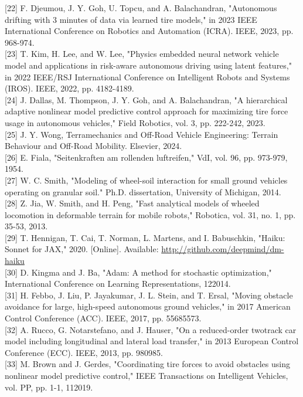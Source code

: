 \documentclass[10pt]{article}
\begin{document}
[22] F. Djeumou, J. Y. Goh, U. Topcu, and A. Balachandran, "Autonomous drifting with 3 minutes of data via learned tire models," in 2023 IEEE International Conference on Robotics and Automation (ICRA). IEEE, 2023, pp. 968-974.\\[0pt]
[23] T. Kim, H. Lee, and W. Lee, "Physics embedded neural network vehicle model and applications in risk-aware autonomous driving using latent features," in 2022 IEEE/RSJ International Conference on Intelligent Robots and Systems (IROS). IEEE, 2022, pp. 4182-4189.\\[0pt]
[24] J. Dallas, M. Thompson, J. Y. Goh, and A. Balachandran, "A hierarchical adaptive nonlinear model predictive control approach for maximizing tire force usage in autonomous vehicles," Field Robotics, vol. 3, pp. 222-242, 2023.\\[0pt]
[25] J. Y. Wong, Terramechanics and Off-Road Vehicle Engineering: Terrain Behaviour and Off-Road Mobility. Elsevier, 2024.\\[0pt]
[26] E. Fiala, "Seitenkraften am rollenden luftreifen," VdI, vol. 96, pp. 973-979, 1954.\\[0pt]
[27] W. C. Smith, "Modeling of wheel-soil interaction for small ground vehicles operating on granular soil." Ph.D. dissertation, University of Michigan, 2014.\\[0pt]
[28] Z. Jia, W. Smith, and H. Peng, "Fast analytical models of wheeled locomotion in deformable terrain for mobile robots," Robotica, vol. 31, no. 1, pp. 35-53, 2013.\\[0pt]
[29] T. Hennigan, T. Cai, T. Norman, L. Martens, and I. Babuschkin, "Haiku: Sonnet for JAX," 2020. [Online]. Available: \href{http://github.com/deepmind/dm-haiku}{http://github.com/deepmind/dm-haiku}\\[0pt]
[30] D. Kingma and J. Ba, "Adam: A method for stochastic optimization," International Conference on Learning Representations, 122014.\\[0pt]
[31] H. Febbo, J. Liu, P. Jayakumar, J. L. Stein, and T. Ersal, "Moving obstacle avoidance for large, high-speed autonomous ground vehicles," in 2017 American Control Conference (ACC). IEEE, 2017, pp. 55685573.\\[0pt]
[32] A. Rucco, G. Notarstefano, and J. Hauser, "On a reduced-order twotrack car model including longitudinal and lateral load transfer," in 2013 European Control Conference (ECC). IEEE, 2013, pp. 980985.\\[0pt]
[33] M. Brown and J. Gerdes, "Coordinating tire forces to avoid obstacles using nonlinear model predictive control," IEEE Transactions on Intelligent Vehicles, vol. PP, pp. 1-1, 112019.\\[0pt]
\end{document}
